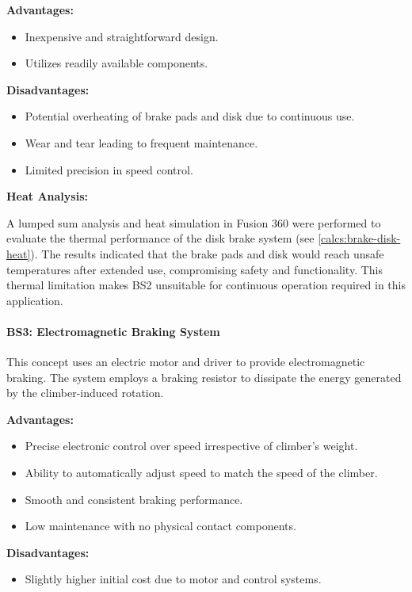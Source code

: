 \textbf{Advantages:}
\begin{itemize}
    \item Inexpensive and straightforward design.
    \item Utilizes readily available components.
\end{itemize}

\textbf{Disadvantages:}
\begin{itemize}
    \item Potential overheating of brake pads and disk due to continuous use.
    \item Wear and tear leading to frequent maintenance.
    \item Limited precision in speed control.
\end{itemize}

\textbf{Heat Analysis:}

A lumped sum analysis and heat simulation in Fusion 360 were performed to evaluate the thermal performance of the disk brake system (see \ref{calcs:brake-disk-heat}). The results indicated that the brake pads and disk would reach unsafe temperatures after extended use, compromising safety and functionality. This thermal limitation makes BS2 unsuitable for continuous operation required in this application.

\paragraph{BS3: Electromagnetic Braking System}

This concept uses an electric motor and driver to provide electromagnetic braking. The system employs a braking resistor to dissipate the energy generated by the climber-induced rotation.

\textbf{Advantages:}
\begin{itemize}
    \item Precise electronic control over speed irrespective of climber's weight.
    \item Ability to automatically adjust speed to match the speed of the climber.
    \item Smooth and consistent braking performance.
    \item Low maintenance with no physical contact components.
\end{itemize}

\textbf{Disadvantages:}
\begin{itemize}
    \item Slightly higher initial cost due to motor and control systems.
\end{itemize}

